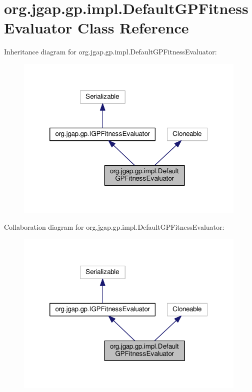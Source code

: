 \hypertarget{classorg_1_1jgap_1_1gp_1_1impl_1_1_default_g_p_fitness_evaluator}{\section{org.\-jgap.\-gp.\-impl.\-Default\-G\-P\-Fitness\-Evaluator Class Reference}
\label{classorg_1_1jgap_1_1gp_1_1impl_1_1_default_g_p_fitness_evaluator}
}


Inheritance diagram for org.\-jgap.\-gp.\-impl.\-Default\-G\-P\-Fitness\-Evaluator\-:
\nopagebreak
\begin{figure}[H]
\begin{center}
\leavevmode
\includegraphics[width=314pt]{classorg_1_1jgap_1_1gp_1_1impl_1_1_default_g_p_fitness_evaluator__inherit__graph}
\end{center}
\end{figure}


Collaboration diagram for org.\-jgap.\-gp.\-impl.\-Default\-G\-P\-Fitness\-Evaluator\-:
\nopagebreak
\begin{figure}[H]
\begin{center}
\leavevmode
\includegraphics[width=314pt]{classorg_1_1jgap_1_1gp_1_1impl_1_1_default_g_p_fitness_evaluator__coll__graph}
\end{center}
\end{figure}
